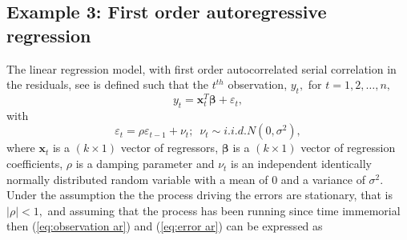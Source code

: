 \documentclass[article]{jss}
\begin{document}
\subsection{Example 3: First order autoregressive regression}
\label{sub:Example-3:-First}

The linear regression model, with first order autocorrelated serial
correlation in the residuals, see \citet{Zellner1971} is defined such
that the $t^{th}$ observation, $y_{t},$ for
$t=1,2,\dots,n,$
\begin{equation}
  y_{t}=\bm{x}_{t}^{T}\bm{\beta}+\varepsilon_{t},\label{eq:observation
    ar}
\end{equation} 
with
\begin{equation}
  \varepsilon_{t}=\rho\varepsilon_{t-1}+\nu_{t};\,\,\,\nu_{t}\sim
  i.i.d.N(0,\sigma^{2}),
\label{eq:error ar}
\end{equation} where
\textbf{$\bm{x}_{t}$} is a $\left(k\times1\right)$ vector of
regressors, $\bm{\beta}$ is a $\left(k\times1\right)$ vector of
regression coefficients, $\rho$ is a damping parameter and $\nu_{t}$
is an independent identically normally distributed random variable
with a mean of 0 and a variance of $\sigma^{2}.$ Under the assumption
the the process driving the errors are stationary, that is $|\rho|<1,$
and assuming that the process has been running since time immemorial
then (\ref{eq:observation ar}) and (\ref{eq:error ar}) can be
expressed as
\end{document}
